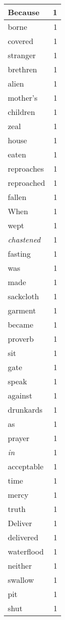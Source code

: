 \begin{center}
\begin{longtable}{l|r}
Because & 1\\ \hline 
borne & 1\\ \hline 
covered & 1\\ \hline 
stranger & 1\\ \hline 
brethren & 1\\ \hline 
alien & 1\\ \hline 
mother's & 1\\ \hline 
children & 1\\ \hline 
zeal & 1\\ \hline 
house & 1\\ \hline 
eaten & 1\\ \hline 
reproaches & 1\\ \hline 
reproached & 1\\ \hline 
fallen & 1\\ \hline 
When & 1\\ \hline 
wept & 1\\ \hline 
\emph{chastened} & 1\\ \hline 
fasting & 1\\ \hline 
was & 1\\ \hline 
made & 1\\ \hline 
sackcloth & 1\\ \hline 
garment & 1\\ \hline 
became & 1\\ \hline 
proverb & 1\\ \hline 
sit & 1\\ \hline 
gate & 1\\ \hline 
speak & 1\\ \hline 
against & 1\\ \hline 
drunkards & 1\\ \hline 
as & 1\\ \hline 
prayer & 1\\ \hline 
\emph{in} & 1\\ \hline 
acceptable & 1\\ \hline 
time & 1\\ \hline 
mercy & 1\\ \hline 
truth & 1\\ \hline 
Deliver & 1\\ \hline 
delivered & 1\\ \hline 
waterflood & 1\\ \hline 
neither & 1\\ \hline 
swallow & 1\\ \hline 
pit & 1\\ \hline 
shut & 1\\ \hline 

\end{longtable}
\end{center}
